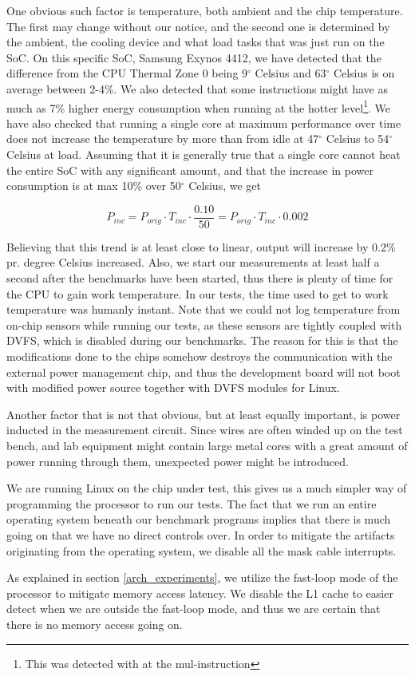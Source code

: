 \label{sec:temperature}
One obvious such factor is temperature, both ambient and the chip temperature.
The first may change without our notice, and the second one is determined by the
ambient, the cooling device and what load tasks that was just run on the SoC. On
this specific SoC, Samsung Exynos 4412, we have detected that the difference
from the CPU Thermal Zone 0 being 9$^\circ$ Celsius and 63$^\circ$ Celsius is on
average between 2-4\%. We also detected that some instructions might have as
much as 7\% higher energy consumption when running at the hotter
level\footnote{This was detected with at the {\ttfamily mul}-instruction}. We
have also checked that running a single core at maximum performance over time
does not increase the temperature by more than from idle at 47$^\circ$ Celsius
to 54$^\circ$ Celsius at load. Assuming that it is generally true that a single
core cannot heat the entire SoC with any significant amount, and that the
increase in power consumption is at max 10\% over 50$^\circ$ Celsius, we get

\begin{equation}
    P_{inc} = P_{orig} \cdot T_{inc} \cdot \frac{0.10}{50} = P_{orig} \cdot T_{inc} \cdot 0.002
\end{equation}

Believing that this trend is at least close to linear, output will increase by
0.2\% pr.  degree Celsius increased. Also, we start our measurements at least
half a second after the benchmarks have been started, thus there is plenty of
time for the CPU to gain work temperature. In our tests, the time used to get to
work temperature was humanly instant. Note that we could not log temperature
from on-chip sensors while running our tests, as these sensors are tightly coupled
with DVFS, which is disabled during our benchmarks. The reason for this is that
the modifications done to the chips somehow destroys the communication with the external
power management chip, and thus the development board will not boot with modified
power source together with DVFS modules for Linux.

Another factor that is not that obvious, but at least equally important, is
power inducted in the measurement circuit. Since wires are often winded up on
the test bench, and lab equipment might contain large metal cores with a great
amount of power running through them, unexpected power might be introduced.

We are running Linux on the chip under test, this gives us a much simpler way of
programming the processor to run our tests. The fact that we run an entire
operating system beneath our benchmark programs implies that there is much going
on that we have no direct controls over.  In order to mitigate the artifacts
originating from the operating system, we disable all the mask cable interrupts.

As explained in section \ref{arch_experiments}, we utilize the fast-loop mode of
the processor to mitigate memory access latency. We disable the L1 cache to
easier detect when we are outside the fast-loop mode, and thus we are certain
that there is no memory access going on.
